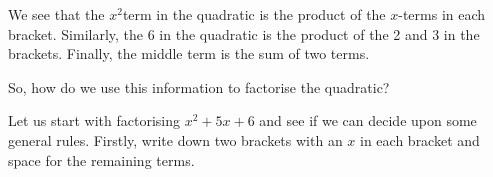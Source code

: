       \label{m39394*id275871}We see that the ${x}^{2}$\hspace{1ex}term in the quadratic is the product of the $x$-terms in each bracket. Similarly, the 6 in the quadratic is the product of the 2 and 3 in the brackets. Finally, the middle term is the sum of two terms.\par 
      \label{m39394*id275901}So, how do we use this information to factorise the quadratic?\par 
      \label{m39394*id275905}Let us start with factorising ${x}^{2}+5x+6$ \hspace{1ex}and see if we can decide upon some general rules. Firstly, write down two brackets with an $x$ in each bracket and space for the remaining terms.\par 
